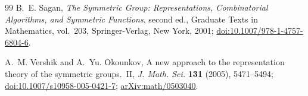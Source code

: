 \documentclass[11pt]{article}
\theoremstyle{definition}
\theoremstyle{remark}
\begin{document}
\begin{thebibliography}{99}
B.~E. Sagan,
\newblock \emph{The Symmetric Group: Representations, Combinatorial Algorithms, and Symmetric Functions}, second ed.,
\newblock Graduate Texts in Mathematics, vol.~203, Springer-Verlag, New York, 2001;
\href{https://doi.org/10.1007/978-1-4757-6804-6}{doi:10.1007/978-1-4757-6804-6}.

A.~M. Vershik and A.~Yu. Okounkov,
\newblock A new approach to the representation theory of the symmetric groups.~II,
\newblock \emph{J. Math. Sci.} \textbf{131} (2005), 5471--5494;
\href{https://doi.org/10.1007/s10958-005-0421-7}{doi:10.1007/s10958-005-0421-7};
\href{https://arxiv.org/abs/math/0503040}{arXiv:math/0503040}.

\end{thebibliography}
\endgroup
\end{document}
